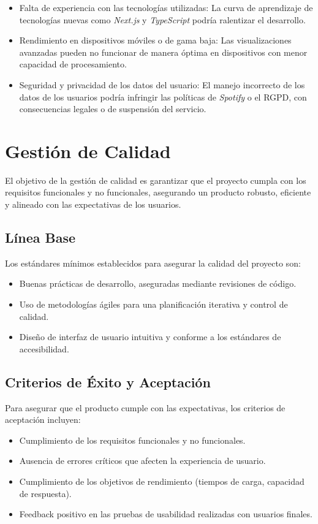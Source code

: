 \begin{itemize}
    \item Falta de experiencia con las tecnologías utilizadas: La curva de aprendizaje de tecnologías nuevas como \textit{Next.js} y \textit{TypeScript} podría ralentizar el desarrollo.

    \item Rendimiento en dispositivos móviles o de gama baja: Las visualizaciones avanzadas pueden no funcionar de manera óptima en dispositivos con menor capacidad de procesamiento.

    \item Seguridad y privacidad de los datos del usuario: El manejo incorrecto de los datos de los usuarios podría infringir las políticas de \textit{Spotify} o el RGPD, con consecuencias legales o de suspensión del servicio.

\end{itemize}


\section{Gestión de Calidad}

El objetivo de la gestión de calidad es garantizar que el proyecto cumpla con los requisitos funcionales y no funcionales, asegurando un producto robusto, eficiente y alineado con las expectativas de los usuarios.

\subsection{Línea Base}
Los estándares mínimos establecidos para asegurar la calidad del proyecto son:
\begin{itemize}
    \item Buenas prácticas de desarrollo, aseguradas mediante revisiones de código.
    \item Uso de metodologías ágiles para una planificación iterativa y control de calidad.
    \item Diseño de interfaz de usuario intuitiva y conforme a los estándares de accesibilidad.
\end{itemize}

\subsection{Criterios de Éxito y Aceptación}
Para asegurar que el producto cumple con las expectativas, los criterios de aceptación incluyen:
\begin{itemize}
    \item Cumplimiento de los requisitos funcionales y no funcionales.
    \item Ausencia de errores críticos que afecten la experiencia de usuario.
    \item Cumplimiento de los objetivos de rendimiento (tiempos de carga, capacidad de respuesta).
    \item Feedback positivo en las pruebas de usabilidad realizadas con usuarios finales.
\end{itemize}

